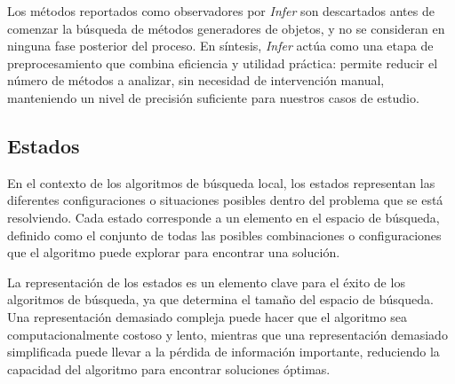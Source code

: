 Los métodos reportados como observadores por \emph{Infer} son descartados antes de comenzar la búsqueda de métodos generadores de objetos, y no se consideran en ninguna fase posterior del proceso.
En síntesis, \emph{Infer} actúa como una etapa de preprocesamiento que combina eficiencia y utilidad práctica: permite reducir el número de métodos a analizar, sin necesidad de intervención manual, manteniendo un nivel de precisión suficiente para nuestros casos de estudio.




\subsection{Estados}
\label{sec:estados}
En el contexto de los algoritmos de búsqueda local, los estados representan las diferentes configuraciones o situaciones posibles dentro del problema que se está resolviendo. Cada estado corresponde a un elemento en el espacio de búsqueda, definido como el conjunto de todas las posibles combinaciones o configuraciones que el algoritmo puede explorar para encontrar una solución.

La representación de los estados es un elemento clave para el éxito de los algoritmos de búsqueda, ya que determina el tamaño del espacio de búsqueda. 
Una representación demasiado compleja puede hacer que el algoritmo sea computacionalmente costoso y lento, mientras que una representación demasiado simplificada puede llevar a la pérdida de información importante, reduciendo la capacidad del algoritmo para encontrar soluciones óptimas.

